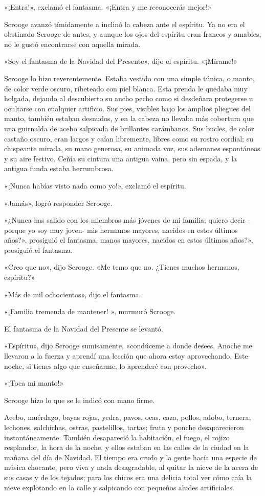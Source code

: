 \documentclass{novela}
\begin{document}
 «¡Entra!», exclamó el fantasma. «¡Entra y me reconocerás mejor!»

 Scrooge avanzó tímidamente a inclinó la cabeza ante el espíritu. Ya no era el obstinado Scrooge de antes, y aunque los ojos del espíritu eran francos y amables, no le gustó encontrarse con aquella mirada.

 «Soy el fantasma de la Navidad del Presente», dijo el espíritu. «¡Mírame!»

 Scrooge lo hizo reverentemente. Estaba vestido con una simple túnica, o manto, de color verde oscuro, ribeteado con piel blanca. Esta prenda le quedaba muy holgada, dejando al descubierto su ancho pecho como si desdeñara protegerse u ocultarse con cualquier artificio. Sus pies, visibles bajo los amplios pliegues del manto, también estaban desnudos, y en la cabeza no llevaba más cobertura que una guirnalda de acebo salpicada de brillantes carámbanos. Sus bucles, de color castaño oscuro, eran largos y caían libremente, libres como su rostro cordial; su chispeante mirada, su mano generosa, su animada voz, sus ademanes espontáneos y su aire festivo. Ceñía su cintura una antigua vaina, pero sin espada, y la antigua funda estaba herrumbrosa.

 «¡Nunca habías visto nada como yo!», exclamó el espíritu.

 «Jamás», logró responder Scrooge.

 «¿Nunca has salido con los miembros más jóvenes de mi familia; quiero decir -porque yo soy muy joven- mis hermanos mayores, nacidos en estos últimos años?», prosiguió el fantasma. manos mayores, nacidos en estos últimos años?», prosiguió el fantasma.

 «Creo que no», dijo Scrooge. «Me temo que no. ¿Tienes muchos hermanos, espíritu?»

 «Más de mil ochocientos», dijo el fantasma.

 «¡Familia tremenda de mantener! », murmuró Scrooge.

 El fantasma de la Navidad del Presente se levantó.

 «Espíritu», dijo Scrooge sumisamente, «condúceme a donde desees. Anoche me llevaron a la fuerza y aprendí una lección que ahora estoy aprovechando. Este noche, si tienes algo que enseñarme, lo aprenderé con provecho».

 «¡Toca mi manto!»

 Scrooge hizo lo que se le indicó con mano firme.

 Acebo, muérdago, bayas rojas, yedra, pavos, ocas, caza, pollos, adobo, ternera, lechones, salchichas, ostras, pastelillos, tartas; fruta y ponche desaparecieron instantáneamente. También desapareció la habitación, el fuego, el rojizo resplandor, la hora de la noche, y ellos estaban en las calles de la ciudad en la mañana del día de Navidad. El tiempo era crudo y la gente hacía una especie de música chocante, pero viva y nada desagradable, al quitar la nieve de la acera de sus casas y de los tejados; para los chicos era una delicia total ver cómo caía la nieve explotando en la calle y salpicando con pequeños aludes artificiales.
\end{document}
